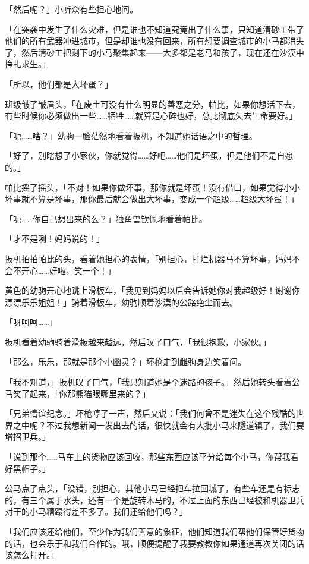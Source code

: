 「然后呢？」小听众有些担心地问。

「在突袭中发生了什么灾难，但是谁也不知道究竟出了什么事，只知道清砂工带了他们的所有武器冲进城市，但是却谁也没有回来，所有想要调查城市的小马都消失了，然后清砂工把剩下的小马聚集起来——大多都是老马和孩子，现在还在沙漠中挣扎求生。」

「所以，他们都是大坏蛋？」

班级皱了皱眉头，「在废土可没有什么明显的善恶之分，帕比，如果你想活下去，有些时候你必须做出一些……牺牲……就算是心碎也好，总比彻底失去生命要好。」

「呃……啥？」幼驹一脸茫然地看着扳机，不知道她话语之中的哲理。

「好了，别瞎想了小家伙，你就觉得……好吧……他们是坏蛋，但是他们不是自愿的。」

帕比摇了摇头，「不对！如果你做坏事，那你就是坏蛋！没有借口，如果觉得小小坏事就不算是坏事，那你最后就会做出大坏事，变成一个超级……超级大坏蛋！」

「呃……你自己想出来的么？」独角兽钦佩地看着帕比。

「才不是咧！妈妈说的！」

扳机拍拍帕比的头，看着她担心的表情，「别担心，打烂机器马不算坏事，妈妈不会不开心……好啦，笑一个！」

黄色的幼驹开心地跳上滑板车，「我见到妈妈以后会告诉她你对我超级好！谢谢你漂漂乐乐姐姐！」骑着滑板车，幼驹顺着沙漠的公路绝尘而去。

「呀呵呵……」

扳机看着幼驹骑着滑板越来越远，然后叹了口气，「我很抱歉，小家伙。」

「那么，乐乐，那就是那个小幽灵？」坏枪走到雌驹身边笑着问。

「我不知道，」扳机叹了口气，「我只知道她是个迷路的孩子。」然后她转头看着公马笑了起来，「你那熊猫眼哪里来的？」

「兄弟情谊纪念。」坏枪哼了一声，然后又说：「我们何曾不是迷失在这个残酷的世界之中呢？不过我想新闻一发出去的话，很快就会有大批小马来隧道镇了，我们要增招卫兵。」

「说到那个……马车上的货物应该回收，那些东西应该平分给每个小马，你帮我看好黑帽子。」

公马点了点头，「没错，别担心，其他小马已经把车拉回城了，有些车还是有标志的，有三个属于水头，还有一个是旋转木马的，不过上面的东西已经被和机器卫兵对干的小马糟蹋得差不多了。我们还给他们吗？」

「我们应该还给他们，至少作为我们善意的象征，他们知道我们帮他们保管好货物的话，也会乐于和我们合作的。哦，顺便提醒了我要教教你如果通道再次关闭的话该怎么打开。」

